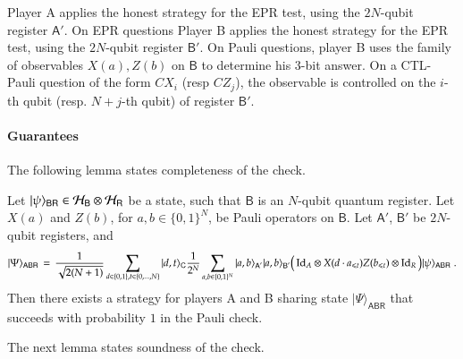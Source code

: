 \documentclass[11pt,letterpaper]{article}
\newcommand{\Id}{\mathop{\mathrm{Id}}\!\mathinner{}}
\newcommand{\ket}[1]{|#1\rangle}
\newcommand{\reg}[1]{{\textsf{#1}}}
\begin{document}
Player A applies the honest strategy for the EPR test, using the $2N$-qubit register $\reg{A}'$. On EPR questions Player B applies the  honest strategy for the EPR test, using the $2N$-qubit register $\reg{B}'$. On Pauli questions, player B uses the family of observables $X(a),Z(b)$ on $\reg{B}$ to determine his $3$-bit answer. On a CTL-Pauli question of the form $CX_i$ (resp $CZ_j$), the observable is controlled on the $i$-th qubit (resp. $N+j$-th qubit) of register $\reg{B}'$. 

\paragraph{Guarantees}
The following lemma states completeness of the check. 

\begin{lemma}
Let $\ket{\psi}_{\reg{BR}} \in \cH_\reg{B} \otimes \cH_\reg{R}$ be a state, such that $\reg{B}$ is an $N$-qubit quantum register. Let $X(a)$ and $Z(b)$, for $a,b\in\{0,1\}^N$, be Pauli operators on $\reg{B}$. Let $\reg{A}'$, $\reg{B}'$ be $2N$-qubit registers, and 
\begin{equation}\label{eq:honest-psi}\ket{\Psi}_{\reg{ABR}} \,=\, \frac{1}{\sqrt{2(N+1)}} \sum_{d\in\{0,1\},t\in\{0,\ldots,N\}} \ket{d,t}_{\reg{C}}  \frac{1}{2^N} \sum_{a,b \in \{0,1\}^N} \ket{a,b}_{\reg{A}'} \ket{a,b}_{\reg{B}'} \big(\Id_A \otimes X(d\cdot a_{\leq t}) Z(b_{\leq t})\otimes \Id_R\big)\ket{\psi}_\reg{ABR}\;.
\end{equation}
Then there exists a strategy for players A and B sharing state $\ket{\Psi}_{\reg{ABR}}$ that succeeds with probability $1$ in the Pauli check.  
\end{lemma}

The next lemma states soundness of the check.
\end{document}
